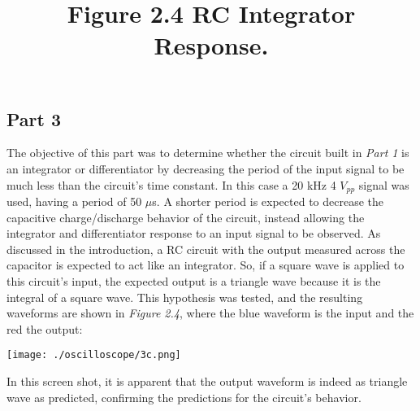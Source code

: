 \documentclass[12pt]{article}
\begin{document}
\subsection*{Part 3}
The objective of this part was to determine whether the circuit built in \textit{Part 1} is an integrator or differentiator by decreasing the period of the input signal to be much less than the circuit's time constant. In this case a 20 kHz 4 $V_{pp}$ signal was used, having a period of 50 $\mu$s. A shorter period is expected to decrease the capacitive charge/discharge behavior of the circuit, instead allowing the integrator and differentiator response to an input signal to be observed. As discussed in the introduction, a RC circuit with the output measured across the capacitor is expected to act like an integrator. So, if a square wave is applied to this circuit's input, the expected output is a triangle wave because it is the integral of a square wave. This hypothesis was tested, and the resulting waveforms are shown in \textit{Figure 2.4}, where the blue waveform is the input and the red the output:\par\vspace{6pt}
\title{\textbf{Figure 2.4} RC Integrator Response.}
\begin{center}
 \texttt{[image: ./oscilloscope/3c.png]}
\end{center}
In this screen shot, it is apparent that the output waveform is indeed as triangle wave as predicted, confirming the predictions for the circuit's behavior.
\end{document}
